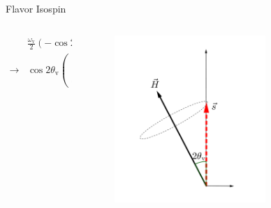\documentclass[9pt]{beamer}
\begin{document}
\begin{darkframes}
\begin{frame}{Flavor Isospin}
\begin{columns}[T]
\begin{column}{0.5\textwidth}
\begin{align*}
&\frac{\omega_{\mathrm v} }{2}\left( - \cos 2\theta_{\mathrm v } \boldsymbol{\sigma}_3  + \sin 2\theta_{\mathrm{v}} \boldsymbol{\sigma}_1\ \right)\\
\to & \cos 2\theta_{\mathrm v}\begin{pmatrix}
0\\
0\\
\omega_{\mathrm v}
\end{pmatrix} -\sin 2\theta_{\mathrm v}\begin{pmatrix}
\omega_{\mathrm v}\\
0\\
0
\end{pmatrix}
\end{align*}



\end{column}%
\begin{column}{0.5\textwidth}

\begin{figure}
    \centering
    \includegraphics[width=0.7\textwidth]{assets/flavor-isospin-1}
\end{figure}



\end{column}
\end{columns}





\end{frame}
\end{darkframes}
\end{document}
